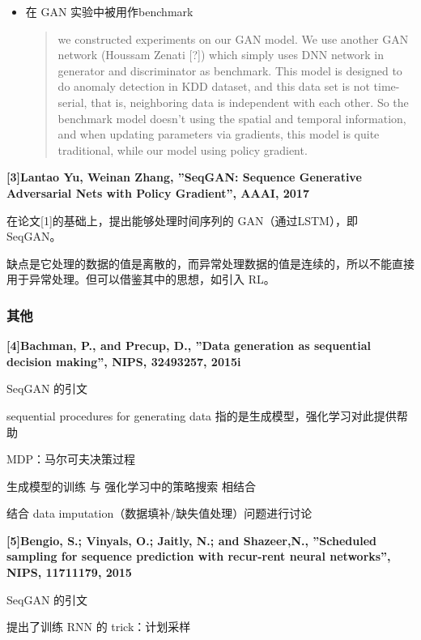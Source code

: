 \documentclass[12pt]{article}
\begin{document}
\begin{itemize}
\item
  在 GAN 实验中被用作benchmark

  \begin{quote}
  we constructed experiments on our GAN model. We use another GAN
  network (Houssam Zenati {[}?{]}) which simply uses DNN network in
  generator and discriminator as benchmark. This model is designed to do
  anomaly detection in KDD dataset, and this data set is not
  time-serial, that is, neighboring data is independent with each other.
  So the benchmark model doesn't using the spatial and temporal
  information, and when updating parameters via gradients, this model is
  quite traditional, while our model using policy gradient.
  \end{quote}
\end{itemize}

\textbf{{[}3{]}Lantao Yu, Weinan Zhang, ''SeqGAN: Sequence Generative
Adversarial Nets with Policy Gradient'', AAAI, 2017 }

在论文{[}1{]}的基础上，提出能够处理时间序列的 GAN（通过LSTM），即
SeqGAN。

缺点是它处理的数据的值是离散的，而异常处理数据的值是连续的，所以不能直接用于异常处理。但可以借鉴其中的思想，如引入
RL。

\subsubsection{其他}\label{header-n191}

\textbf{{[}4{]}Bachman, P., and Precup, D., ''Data generation as
sequential decision making'', NIPS, 32493257, 2015i}

SeqGAN 的引文

sequential procedures for generating data
指的是生成模型，强化学习对此提供帮助

MDP：马尔可夫决策过程

生成模型的训练 与 强化学习中的策略搜索 相结合

结合 data imputation（数据填补/缺失值处理）问题进行讨论

\textbf{{[}5{]}Bengio, S.; Vinyals, O.; Jaitly, N.; and Shazeer,N.,
''Scheduled sampling for sequence prediction with recur-rent neural
networks'', NIPS, 11711179, 2015}

SeqGAN 的引文

提出了训练 RNN 的 trick：计划采样
\end{document}
